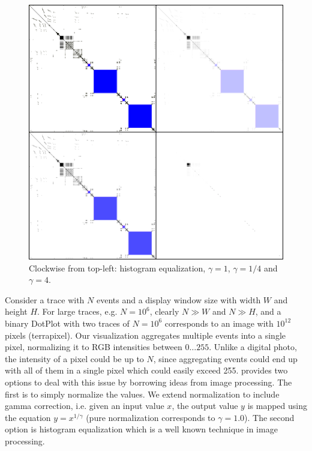 \begin{figure}[tb]
\begin{center}
\includegraphics[width=0.8\columnwidth]{lviz/gamma.png}
\caption{Clockwise from top-left:
histogram equalization, $\gamma=1$,
$\gamma=1/4$ and $\gamma=4$.
}
\label{fig:gamma}
\end{center}
\end{figure}

Consider a trace with $N$ events and
a display window size with width $W$ and height $H$.
For large traces, e.g. $N=10^6$, clearly $N \gg W$ and $N \gg H$,
and a binary DotPlot with two traces of $N=10^6$ corresponds to an
image with $10^{12}$ pixels (terrapixel).
Our \VDP{} visualization aggregates multiple events into a single pixel,
normalizing it to RGB intensities between $0\ldots255$.
Unlike a digital photo, the intensity of a pixel could be up to $N$,
since aggregating events could end up with all of them
in a single pixel which could easily exceed 255.
\lviz{} provides two options to deal with this issue by borrowing 
ideas from image processing.
The first is to simply normalize the values.
We extend normalization to include gamma correction, i.e. given an input value $x$,
the output value $y$ is mapped using the equation $y=x^{1/\gamma}$
(pure normalization corresponds to $\gamma = 1.0$).
The second option is histogram equalization which is
a well known technique in image processing.


